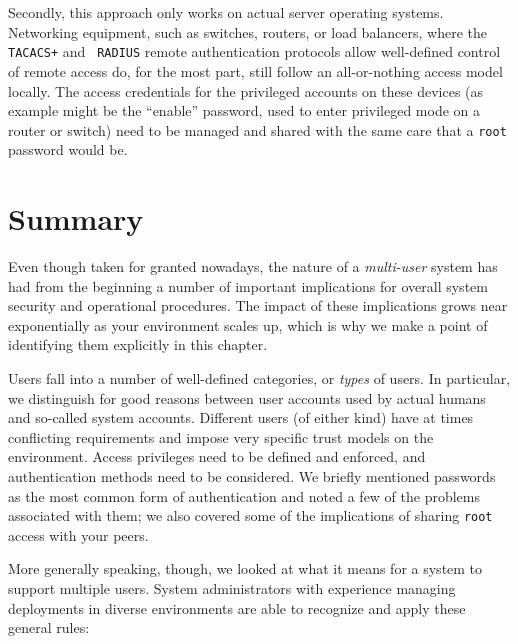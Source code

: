 Secondly, this approach only works on actual server
operating systems.  Networking equipment, such as
switches, routers, or load balancers, where the {\tt
TACACS+} and {\tt
RADIUS} remote authentication
protocols allow well-defined control of remote access
do, for the most part, still follow an all-or-nothing
access model locally.  The access credentials for the
privileged accounts on these devices (as example might
be the ``enable'' password, used to enter privileged
mode on a router or switch) need to be managed and
shared with the same care that a {\tt root} password
would be.

\section{Summary}
\label{multi-user:summary}

Even though taken for granted nowadays, the nature of
a {\em multi-user} system has had from the beginning a
number of important implications for overall system
security and operational procedures.  The impact of
these implications grows near exponentially as your
environment scales up, which is why we make a point of
identifying them explicitly in this chapter.

Users fall into a number of well-defined categories,
or {\em types} of users.  In particular, we
distinguish for good reasons between user accounts
used by actual humans and so-called system accounts.
Different users (of either kind) have at times
conflicting requirements and impose very specific
trust models on the environment.  Access privileges
need to be defined and enforced, and authentication
methods need to be considered.  We briefly mentioned
passwords as the most common form of authentication
and noted a few of the problems associated with them;
we also covered some of the implications of sharing
{\tt root} access with your peers.

More generally speaking, though, we looked at what it
means for a system to support multiple users.  System
administrators with experience managing deployments in
diverse environments are able to recognize and apply
these general rules:

